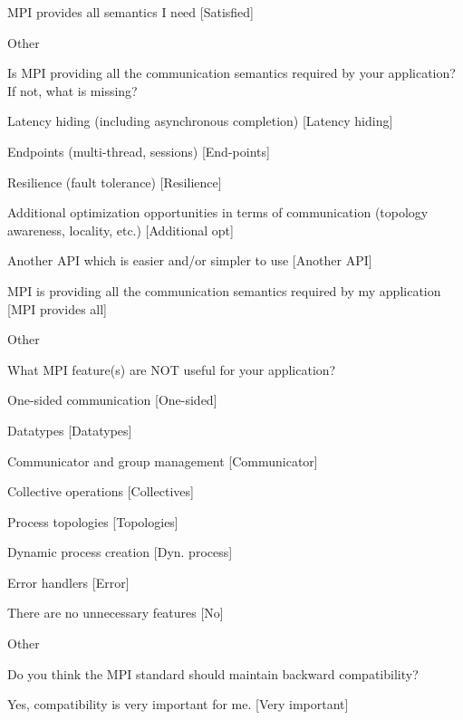 \documentclass[preprint,5p,times]{elsarticle}
\begin{document}
{\begin{description}
\begin{inparaenum}[{\bf C}1)]
    \item MPI provides all semantics I need [Satisfied]
    \item Other
    \end{inparaenum}
  \item[Q26*:] Is MPI providing all the communication semantics required
    by your application? If not, what is missing?
    \begin{inparaenum}[{\bf C}1)]
    \item Latency hiding (including asynchronous completion) [Latency hiding]
    \item Endpoints (multi-thread, sessions) [End-points]
    \item Resilience (fault tolerance) [Resilience]
    \item Additional optimization opportunities in terms of communication
      (topology awareness, locality, etc.) [Additional opt]
    \item Another API which is easier and/or simpler to use [Another API]
    \item MPI is providing all the communication semantics required by my
      application [MPI provides all]
    \item Other
    \end{inparaenum}
  \item[Q27*:] What MPI feature(s) are NOT useful for your application?
    \begin{inparaenum}[{\bf C}1)]
    \item One-sided communication [One-sided]
    \item Datatypes [Datatypes]
    \item Communicator and group management [Communicator]
    \item Collective operations [Collectives]
    \item Process topologies [Topologies]
    \item Dynamic process creation [Dyn. process]
    \item Error handlers [Error]
    \item There are no unnecessary features [No]
    \item Other
    \end{inparaenum}
  \item[Q28:] Do you think the MPI standard should maintain backward
    compatibility?
    \begin{inparaenum}[{\bf C}1)]
    \item Yes, compatibility is very important for me. [Very important]

\end{inparaenum}
\end{description}}
\end{document}
